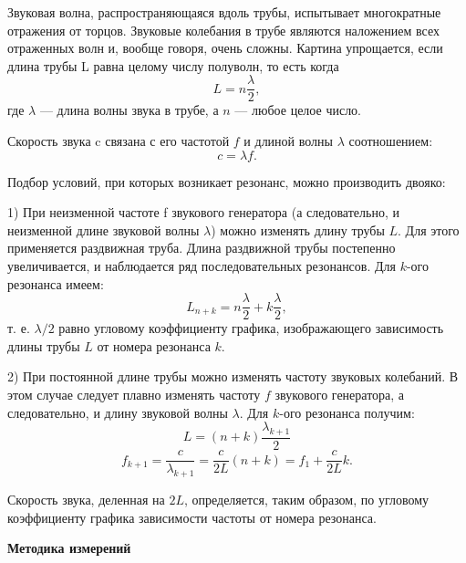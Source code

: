 \documentclass[a4paper, 12pt]{article}%
\begin{document}
Звуковая волна, распространяющаяся вдоль трубы, испытывает многократные отражения от торцов. Звуковые колебания в трубе являются наложением всех отраженных волн и, вообще говоря, очень сложны. Картина упрощается, если длина трубы L равна целому числу полуволн, то есть когда
$$L=n\frac{\lambda}{2},$$
где $\lambda$ — длина волны звука в трубе, а $n$ — любое целое число.

Скорость звука c связана с его частотой $f$ и длиной волны $\lambda$ соотношением:
$$c=\lambda f.$$

Подбор условий, при которых возникает резонанс, можно производить двояко:

1) При неизменной частоте f звукового генератора (а следовательно, и неизменной длине звуковой волны $\lambda$) можно изменять длину трубы $L$. Для этого применяется раздвижная труба. Длина раздвижной трубы постепенно увеличивается, и наблюдается ряд последовательных резонансов. Для $k$-ого резонанса имеем:
$$L_{n+k}=n\frac{\lambda}{2} + k\frac{\lambda}{2},$$
т. е. $\lambda/2$ равно угловому коэффициенту графика, изображающего зависимость длины трубы $L$ от номера резонанса $k$.

2) При постоянной длине трубы можно изменять частоту звуковых
колебаний. В этом случае следует плавно изменять частоту $f$ звукового генератора, а следовательно, и длину звуковой волны $\lambda$.
Для $k$-ого резонанса получим:
$$L = (n+k)\frac{\lambda_{k+1}}{2}$$
$$f_{k+1} = \frac{c}{\lambda_{k+1}}=\frac{c}{2L}(n+k)=f_1 + \frac{c}{2L}k.$$

Скорость звука, деленная на $2L$, определяется, таким образом,
по угловому коэффициенту графика зависимости частоты от номера
резонанса.
	\\
	\newpage
	
	\textbf{Методика измерений}
\end{document}
